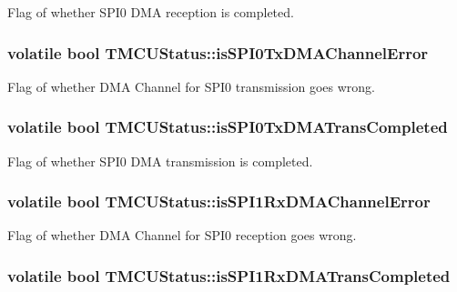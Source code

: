 Flag of whether S\-P\-I0 D\-M\-A reception is completed. \hypertarget{struct_t_m_c_u_status_af25f8dd705dffec7fff2e6085c0794ed}{
\subsubsection[{is\-S\-P\-I0\-Tx\-D\-M\-A\-Channel\-Error}]{\setlength{\rightskip}{0pt plus 5cm}volatile bool T\-M\-C\-U\-Status\-::is\-S\-P\-I0\-Tx\-D\-M\-A\-Channel\-Error}}\label{struct_t_m_c_u_status_af25f8dd705dffec7fff2e6085c0794ed}
Flag of whether D\-M\-A Channel for S\-P\-I0 transmission goes wrong. \hypertarget{struct_t_m_c_u_status_a7f5b9e8989d93b19bbd38b01cb042a7f}{
\subsubsection[{is\-S\-P\-I0\-Tx\-D\-M\-A\-Trans\-Completed}]{\setlength{\rightskip}{0pt plus 5cm}volatile bool T\-M\-C\-U\-Status\-::is\-S\-P\-I0\-Tx\-D\-M\-A\-Trans\-Completed}}\label{struct_t_m_c_u_status_a7f5b9e8989d93b19bbd38b01cb042a7f}
Flag of whether S\-P\-I0 D\-M\-A transmission is completed. \hypertarget{struct_t_m_c_u_status_ae2b77978e33c0cd9dcf7e83bdaa5eba9}{
\subsubsection[{is\-S\-P\-I1\-Rx\-D\-M\-A\-Channel\-Error}]{\setlength{\rightskip}{0pt plus 5cm}volatile bool T\-M\-C\-U\-Status\-::is\-S\-P\-I1\-Rx\-D\-M\-A\-Channel\-Error}}\label{struct_t_m_c_u_status_ae2b77978e33c0cd9dcf7e83bdaa5eba9}
Flag of whether D\-M\-A Channel for S\-P\-I0 reception goes wrong. \hypertarget{struct_t_m_c_u_status_aa864edeb6786363beac08a6c3bac7903}{
\subsubsection[{is\-S\-P\-I1\-Rx\-D\-M\-A\-Trans\-Completed}]{\setlength{\rightskip}{0pt plus 5cm}volatile bool T\-M\-C\-U\-Status\-::is\-S\-P\-I1\-Rx\-D\-M\-A\-Trans\-Completed}}\label{struct_t_m_c_u_status_aa864edeb6786363beac08a6c3bac7903}

